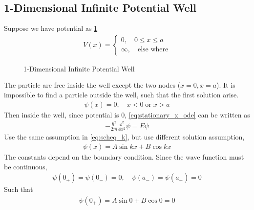 \subsection{1-Dimensional Infinite Potential Well}
Suppose we have potential as \cref{fig:1dwell}
\begin{eqnarray}
    V(x) = \begin{cases}
        0, \quad  0 \leq x \leq a \\
        \infty, \quad \text{else where} 
        \end{cases}
\end{eqnarray}
\begin{figure}[h!]
    \centering
      \caption{1-Dimensional Infinite Potential Well}
      \label{fig:1dwell}
\end{figure}
The particle are free inside the well except the two nodes ($x=0,x=a$). It is impossible to find a particle outside the well, such that the first solution arise.
\begin{eqnarray}
    \psi(x) = 0, \quad x<0 \;\text{or}\; x>a 
\end{eqnarray}
Then inside the well, since potential is 0, \cref{eq:stationary_x_ode} can be written as 
\begin{eqnarray}
    -\frac{\hbar^2}{2m} \frac{\dd^2}{\dd x^2} \psi = E \psi
\end{eqnarray}
Use the same assumption in \cref{eq:scheq_k}, but use different solution assumption,
\begin{eqnarray}
    \psi(x) = A \sin k x + B \cos k x
\end{eqnarray}
The constants depend on the boundary condition. Since the wave function must be continuous, 
\begin{eqnarray}
    \psi(0_+) = \psi(0_-) = 0,\quad \psi(a_-) = \psi(a_+) = 0 
\end{eqnarray}
Such that 
\begin{eqnarray}
    \psi(0_+) = A \sin 0 + B \cos 0 = 0
\end{eqnarray}
